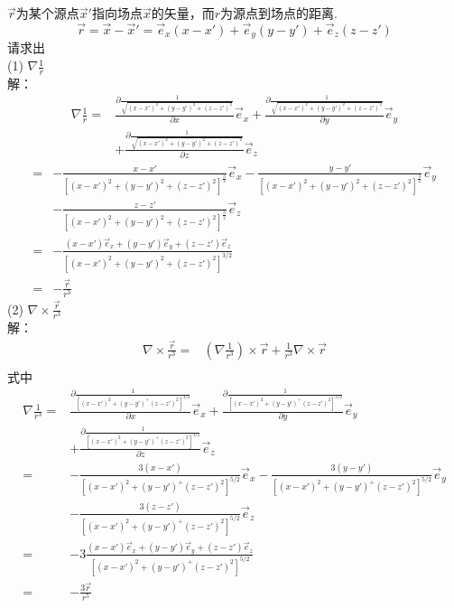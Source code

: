 \documentclass[10pt,a4paper]{article}
\begin{document}
\section{}
$\vec{r}$为某个源点$\vec{x}'$指向场点$\vec{x}$的矢量，而$r$为源点到场点的距离.
\[
\vec{r}=\vec{x}-\vec{x}'=\vec{e}_x(x-x')+\vec{e}_y(y-y')+\vec{e}_z(z-z')
\]
请求出\\
(1) $\nabla\frac{1}{r}$\\
解：
\footnotesize\begin{align*}
\nabla\frac{1}{r}=&\frac{\partial\frac{1}{\sqrt{(x-x')^2+(y-y')^2+(z-z')^2}}}{\partial x}\vec{e}_x+\frac{\partial\frac{1}{\sqrt{(x-x')^2+(y-y')^2+(z-z')^2}}}{\partial y}\vec{e}_y\\
&+\frac{\partial\frac{1}{\sqrt{(x-x')^2+(y-y')^2+(z-z')^2}}}{\partial z}\vec{e}_z
\end{align*}
\begin{align*}
=&-\frac{x-x'}{[(x-x')^2+(y-y')^2+(z-z')^2]^{\frac{3}{2}}}\vec{e}_x-\frac{y-y'}{[(x-x')^2+(y-y')^2+(z-z')^2]^{\frac{3}{2}}}\vec{e}_y\\
&-\frac{z-z'}{[(x-x')^2+(y-y')^2+(z-z')^2]^{\frac{3}{2}}}\vec{e}_z\\
=&-\frac{(x-x')\vec{e}_x+(y-y')\vec{e}_y+(z-z')\vec{e}_z}{[(x-x')^2+(y-y')^2+(z-z')^2]^{3/2}}\\
=&-\frac{\vec{r}}{r^3}
\end{align*}\normalsize
(2) $\nabla\times\frac{\vec{r}}{r^3}$\\
解：
\begin{align*}
\nabla\times\frac{\vec{r}}{r^3}=&(\nabla\frac{1}{r^3})\times\vec{r}+\frac{1}{r^3}\nabla\times\vec{r}\\
\end{align*}
式中
\begin{align*}
\nabla\frac{1}{r^3}=&\frac{\partial\frac{1}{[(x-x')^2+(y-y')^+(z-z')^2]^{3/2}}}{\partial x}\vec{e}_x+\frac{\partial\frac{1}{[(x-x')^2+(y-y')^+(z-z')^2]^{3/2}}}{\partial y}\vec{e}_y\\
&+\frac{\partial\frac{1}{[(x-x')^2+(y-y')^+(z-z')^2]^{3/2}}}{\partial z}\vec{e}_z\\
=&-\frac{3(x-x')}{[(x-x')^2+(y-y')^+(z-z')^2]^{5/2}}\vec{e}_x-\frac{3(y-y')}{[(x-x')^2+(y-y')^+(z-z')^2]^{5/2}}\vec{e}_y\\
&-\frac{3(z-z')}{[(x-x')^2+(y-y')^+(z-z')^2]^{5/2}}\vec{e}_z\\
=&-3\frac{(x-x')\vec{e}_x+(y-y')\vec{e}_y+(z-z')\vec{e}_z}{[(x-x')^2+(y-y')^+(z-z')^2]^{5/2}}\\
=&-\frac{3\vec{r}}{r^5}
\end{align*}
\end{document}
